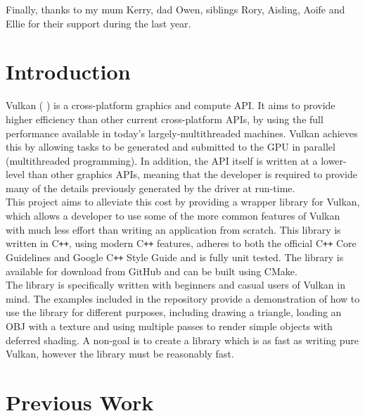 \documentclass[12pt]{report}
\newcommand{\citesoftware}[1]{(\citeauthor{#1} \citeyear{#1})}
\newcommand{\cpp}{C\texttt{++}}
\theoremstyle{definition}
\begin{document}
    Finally, thanks to my mum Kerry, dad Owen, siblings Rory, Aisling, Aoife and Ellie for
    their support during the last year. \\

  \tableofcontents

  \listoffigures

  \lstlistoflistings

  \chapter{Introduction}
    Vulkan \citesoftware{vulkan} is a cross-platform graphics and compute API.
    It aims to provide higher efficiency than other current
    cross-platform APIs, by using the full performance available in today's
    largely-multithreaded machines. Vulkan achieves this by allowing tasks to be
    generated and submitted to the GPU in parallel (multithreaded programming).
    In addition, the API itself is written at a lower-level than other graphics
    APIs, meaning that the developer is required to provide many of the details
    previously generated by the driver at run-time.\\

    This project aims to alleviate this cost by providing a wrapper library for
    Vulkan, which allows a developer to use some of the more common features of
    Vulkan with much less effort than writing an application from scratch. This
    library is written in \cpp{}, using modern \cpp{} features, adheres to both the
    official \cpp{} Core Guidelines and Google \cpp{} Style Guide and is fully unit
    tested. The library is available for download from GitHub and can be built
    using CMake.\\

    The library is specifically written with beginners and casual users of
    Vulkan in mind. The examples included in the repository provide a
    demonstration of how to use the library for different purposes, including
    drawing a triangle, loading an OBJ with a texture and using multiple passes
    to render simple objects with deferred shading. A non-goal is to create a
    library which is as fast as writing pure Vulkan, however the library
    must be reasonably fast.\\

  \chapter{Previous Work}
\end{document}
